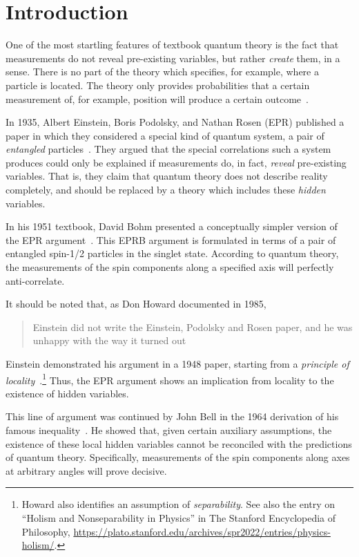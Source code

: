 
\section{Introduction}
\label{sec:introduction}
One of the most startling features of textbook quantum theory is the fact that measurements do not reveal pre-existing variables, but rather \emph{create} them, in a sense.
There is no part of the theory which specifies, for example, where a particle is located.
The theory only provides probabilities that a certain measurement of, for example, position will produce a certain outcome~\cite[section 3]{sep-qm}.

In 1935, Albert Einstein, Boris Podolsky, and Nathan Rosen (EPR) published a paper in which they considered a special kind of quantum system, a pair of \emph{entangled} particles~\cite{Einstein:1935rr}.
They argued that the special correlations such a system produces could only be explained if measurements do, in fact, \emph{reveal} pre-existing variables.
That is, they claim that quantum theory does not describe reality completely, and should be replaced by a theory which includes these \emph{hidden} variables.

In his 1951 textbook, David Bohm presented a conceptually simpler version of the EPR argument~\cite[chapter 22]{Bohm:1951}.
This EPRB argument is formulated in terms of a pair of entangled spin-1/2 particles in the singlet state.
According to quantum theory, the measurements of the spin components along a specified axis will perfectly anti-correlate.

It should be noted that, as Don Howard documented in 1985, \blockcquote[172]{HOWARD1985171}{Einstein did not write the Einstein, Podolsky and Rosen paper, and he was unhappy with the way it turned out}.
Einstein demonstrated his argument in a 1948 paper, starting from a \emph{principle of locality}~\cite{Kiefer2022}.\footnote{
    Howard also identifies an assumption of \emph{separability}.
    See also the entry on \enquote{Holism and Nonseparability in Physics} in The Stanford Encyclopedia of Philosophy, \url{https://plato.stanford.edu/archives/spr2022/entries/physics-holism/}.
}
Thus, the EPR argument shows an implication from locality to the existence of hidden variables.

This line of argument was continued by John Bell in the 1964 derivation of his famous inequality~\cite{Bell:1964kc}.
He showed that, given certain auxiliary assumptions, the existence of these local hidden variables cannot be reconciled with the predictions of quantum theory.
Specifically, measurements of the spin components along axes at arbitrary angles will prove decisive.

